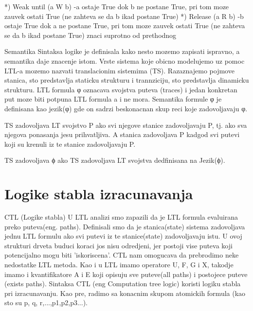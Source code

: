 \documentclass[a4paper]{article}
\begin{document}
{	*) Weak until (a W b) \newline
		-a ostaje True dok b ne postane True, pri tom moze zauvek ostati True (ne zahteva se da b ikad postane True) \newline
	*) Release (a R b) \newline
		-b ostaje True dok a ne postane True, pri tom moze zauvek ostati True (ne zahteva se da b ikad postane True) znaci suprotno od prethodnog \newline

	Semantika
	\newline
	\newline
	Sintaksa logike je definisala kako nesto mozemo zapisati ispravno, a semantika daje znacenje istom.
	Vrste sistema koje obicno modelujemo uz pomoc LTL-a mozemo nazvati translacionim sistemima (TS). Razaznajemo pojmove stanica, sto predstavlja staticku strukturu i trannziciju, sto predstavlja dinamicku strukturu.
	LTL formula φ oznacava svojstva puteva (traces) i jedan konkretan put moze biti potpuna LTL formula a i ne mora.
	Semantika formule φ je definisana kao jezik(φ) gde on sadrzi beskonacnan skup reci koje zadovoljavaju φ.

	TS zadovoljava LT svojstvo P ako svi njegove stanice zadovoljavaju P, tj. ako sva njegova ponasanja jesu prihvatljiva. A stanica zadovoljava P kadgod svi putevi koji su krenuli iz te stanice zadovoljavaju P.

	TS zadovoljava ϕ ako TS zadovoljava LT svojstva dedfinisana na Jezik(ϕ).
	}

	\section{Logike stabla izracunavanja}
	\label{sec:CTL}

	CTL (Logike stabla)
	\newline
	\newline
	U LTL analizi smo zapazili da je LTL formula evaluirana preko puteva(eng. paths). Definisali smo da je stanica(state) sistema
	zadovoljava jednu LTL formulu ako svi putevi iz te stanice(state) zadovoljavaju istu. U ovoj strukturi drveta buduci koraci jos nisu
	odredjeni, jer postoji vise puteva koji potencijalno mogu biti 'iskoriscena'.
	CTL nam omogucava da prebrodimo neke nedostatke LTL metoda. Kao i u LTL imamo operatore U, F, G i X, takodje imamo i kvantifikatore
	A i E koji opisuju sve puteve(all paths) i postojece puteve (exists paths). 
	\newline
	\newline
	Sintaksa
	\newline
	\newline
	CTL (eng Computation tree logic) koristi logiku stabla pri izracunavanju. 
	Kao pre, radimo sa konacnim skupom atomickih formula (kao sto su p, q, r,...,p1,p2,p3...).
\end{document}
